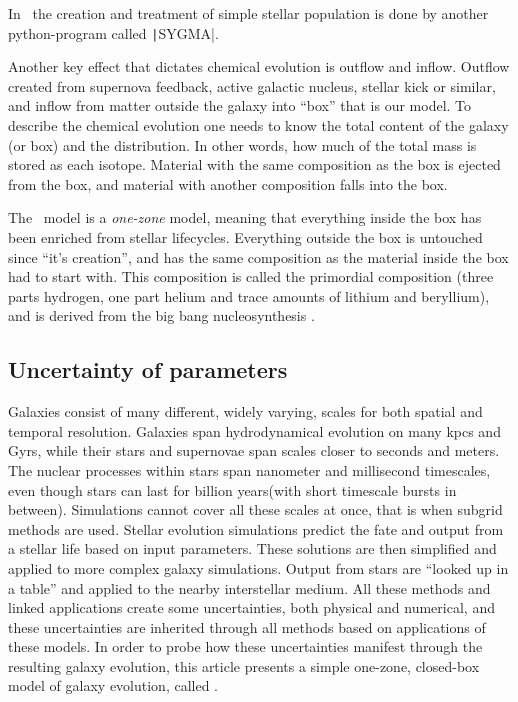 In \omegamodel\ the creation and treatment of simple stellar population is done by another python-program called \texttt|SYGMA|.

Another key effect that dictates chemical evolution is outflow and inflow. Outflow created from supernova feedback, active galactic nucleus, stellar kick or similar, and inflow from matter outside the galaxy into ``box'' that is our model.
To describe the chemical evolution one needs to know the total content of the galaxy (or box) and the distribution. In other words, how much of the total mass is stored as each isotope. Material with the same composition as the box is ejected from the box, and material with another composition falls into the box.

The \omegamodel\ model is a \textit{one-zone} model, meaning that everything inside the box has been enriched from stellar lifecycles. Everything outside the box is untouched since ``it's creation'', and has the same composition as the material inside the box had to start with.
This composition is called the primordial composition (three parts hydrogen, one part helium and trace amounts of lithium and beryllium), and is derived from the big bang nucleosynthesis .

\subsection{Uncertainty of parameters}

Galaxies consist of many different, widely varying, scales for both spatial and temporal resolution.
Galaxies span hydrodynamical evolution on many kpcs and Gyrs, while their stars and supernovae span scales closer to seconds and meters.
The nuclear processes within stars span nanometer and millisecond timescales, even though stars can last for billion years(with short timescale bursts in between).
Simulations cannot cover all these scales at once, that is when subgrid methods are used. Stellar evolution simulations predict the fate and output from a stellar life based on input parameters. These solutions are then simplified and applied to more complex galaxy simulations.
Output from stars are ``looked up in a table'' and applied to the nearby interstellar medium.
All these methods and linked applications create some uncertainties, both physical and numerical, and these uncertainties are inherited through all methods based on applications of these models. In order to probe how these uncertainties manifest through the resulting galaxy evolution, this article presents a simple one-zone, closed-box model of galaxy evolution, called \omegamodel.


